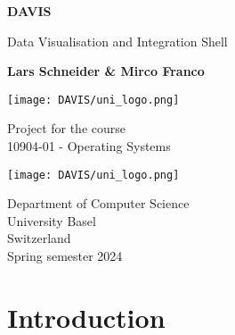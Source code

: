 \documentclass{article} %
\begin{document}
\begin{titlepage}
    \begin{center}
        \vspace*{1cm}

        \Huge
        \textbf{DAVIS}

        \vspace{0.5cm}
        \LARGE
        Data Visualisation and Integration Shell

        \vspace{1.5cm}

        \textbf{Lars Schneider \& Mirco Franco}

        \texttt{[image: DAVIS/uni\_logo.png]} %

        \vfill

        Project for the course\\
        10904-01 - Operating Systems

        \texttt{[image: DAVIS/uni\_logo.png]}

        \Large
        Department of Computer Science\\
        University Basel\\
        Switzerland\\
        Spring semester 2024

    \end{center}
\end{titlepage}

\section{Introduction}
\end{document}
